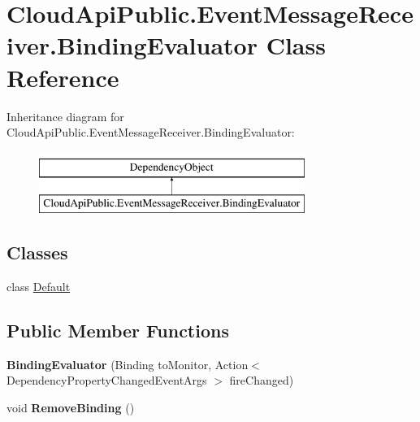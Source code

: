 \hypertarget{class_cloud_api_public_1_1_event_message_receiver_1_1_binding_evaluator}{\section{Cloud\-Api\-Public.\-Event\-Message\-Receiver.\-Binding\-Evaluator Class Reference}
\label{class_cloud_api_public_1_1_event_message_receiver_1_1_binding_evaluator}
}
Inheritance diagram for Cloud\-Api\-Public.\-Event\-Message\-Receiver.\-Binding\-Evaluator\-:\begin{figure}[H]
\begin{center}
\leavevmode
\includegraphics[height=2.000000cm]{class_cloud_api_public_1_1_event_message_receiver_1_1_binding_evaluator}
\end{center}
\end{figure}
\subsection*{Classes}
\begin{DoxyCompactItemize}
\item 
class \hyperlink{class_cloud_api_public_1_1_event_message_receiver_1_1_binding_evaluator_1_1_default}{Default}
\end{DoxyCompactItemize}
\subsection*{Public Member Functions}
\begin{DoxyCompactItemize}
\item 
\hypertarget{class_cloud_api_public_1_1_event_message_receiver_1_1_binding_evaluator_a0cb9ea71e6fa4d7991ee47cf74797151}{{\bfseries Binding\-Evaluator} (Binding to\-Monitor, Action$<$ Dependency\-Property\-Changed\-Event\-Args $>$ fire\-Changed)}\label{class_cloud_api_public_1_1_event_message_receiver_1_1_binding_evaluator_a0cb9ea71e6fa4d7991ee47cf74797151}

\item 
\hypertarget{class_cloud_api_public_1_1_event_message_receiver_1_1_binding_evaluator_a165a8f5e96ded9de8ccce13b5be01ef5}{void {\bfseries Remove\-Binding} ()}\label{class_cloud_api_public_1_1_event_message_receiver_1_1_binding_evaluator_a165a8f5e96ded9de8ccce13b5be01ef5}

\end{DoxyCompactItemize}
